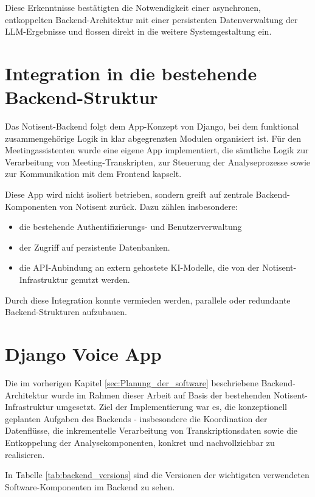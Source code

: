 Diese Erkenntnisse bestätigten die Notwendigkeit einer asynchronen, entkoppelten Backend-Architektur mit einer persistenten Datenverwaltung der LLM-Ergebnisse und flossen direkt in die weitere Systemgestaltung ein. 

\newpage
\section{Integration in die bestehende Backend-Struktur}
Das Notisent-Backend folgt dem App-Konzept von Django, bei dem funktional zusammengehörige Logik in klar abgegrenzten Modulen organisiert ist. Für den Meetingassistenten wurde eine eigene App implementiert, die sämtliche Logik zur Verarbeitung von Meeting-Transkripten, zur Steuerung der Analyseprozesse sowie zur Kommunikation mit dem Frontend kapselt. 

Diese App wird nicht isoliert betrieben, sondern greift auf zentrale Backend-Komponenten von Notisent zurück. Dazu zählen insbesondere: 

\begin{itemize}
    \item die bestehende Authentifizierungs- und Benutzerverwaltung
    \item der Zugriff auf persistente Datenbanken.
    \item die API-Anbindung an extern gehostete KI-Modelle, die von der Notisent-Infrastruktur genutzt werden.
\end{itemize}

Durch diese Integration konnte vermieden werden, parallele oder redundante Backend-Strukturen aufzubauen.


\section{Django Voice App}
Die im vorherigen Kapitel \ref{sec:Planung_der_software} beschriebene Backend-Architektur wurde im Rahmen dieser Arbeit auf Basis der bestehenden Notisent-Infrastruktur umgesetzt. Ziel der Implementierung war es, die konzeptionell geplanten Aufgaben des Backends - insbesondere die Koordination der Datenflüsse, die inkrementelle Verarbeitung von Transkriptionsdaten sowie die Entkoppelung der Analysekomponenten, konkret und nachvollziehbar zu realisieren. 
 
In Tabelle \ref{tab:backend_versions} sind die Versionen der wichtigsten verwendeten Software-Komponenten im Backend zu sehen.

